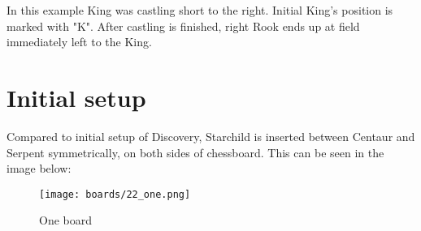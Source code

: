 In this example King was castling short to the right. Initial King's position is
marked with "K". After castling is finished, right Rook ends up at field immediately
left to the King.

\clearpage %

\section*{Initial setup}

Compared to initial setup of Discovery, Starchild is inserted between Centaur and
Serpent symmetrically, on both sides of chessboard. This can be seen in the image
below:

\noindent
\begin{figure}[h]
\texttt{[image: boards/22\_one.png]}
\caption{One board}
\label{fig:22_one}
\end{figure}

\clearpage %
